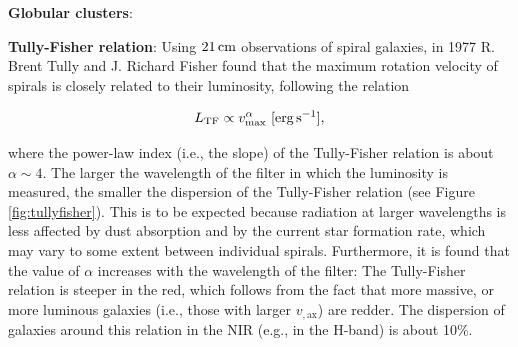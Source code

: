 \documentclass[a4paper,10pt]{article}
\begin{document}
{\noindent}\textbf{Globular clusters}: 

{\noindent}\textbf{Tully-Fisher relation}: Using $21\,{\rm cm}$ observations of spiral galaxies, in 1977 R. Brent Tully and J. Richard Fisher found that the maximum rotation velocity of spirals is closely related to their luminosity, following the relation

\begin{align*}
    L_\mathrm{TF} \propto v_\mathrm{max}^\alpha ~ [{\rm erg\,s^{-1}}],
\end{align*}

{\noindent}where the power-law index (i.e., the slope) of the Tully-Fisher relation is about $\alpha\sim4$. The larger the wavelength of the filter in which the luminosity is measured, the smaller the dispersion of the Tully-Fisher relation (see Figure \ref{fig:tullyfisher}). This is to be expected because radiation at larger wavelengths is less affected by dust absorption and by the current star formation rate, which may vary to some extent between individual spirals. Furthermore, it is found that the value of $\alpha$ increases with the wavelength of the filter: The Tully-Fisher relation is steeper in the red, which follows from the fact that more massive, or more luminous galaxies (i.e., those with larger $v_\mathrm{,ax}$) are redder. The dispersion of galaxies around this relation in the NIR (e.g., in the H-band) is about 10\%.
\end{document}
